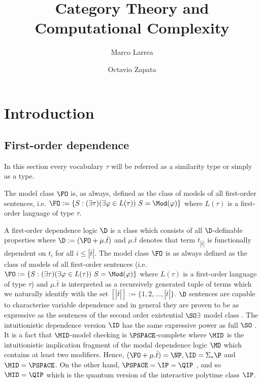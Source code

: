 


\title{Category Theory and \\ Computational Complexity}
\author{Marco Larrea \and Octavio Zapata}


\maketitle

\section{Introduction}

\subsection{First-order dependence}

In this section every vocabulary $\tau$ will be referred as a similarity type or simply as a type.

The model class $\FO$ is, as always, defined as the class of models of all first-order sentences, i.e. $\FO:= \{S:(\exists\tau)(\exists\varphi\in L(\tau))\ S=\Mod(\varphi)\}$ where $L(\tau)$ is a first-order language of type $\tau$.

A first-order dependence logic $\D$ is a class which consists of all $\D$-definable properties where $\D := (\FO + \mu.\bar{t})$ and $\mu.\bar{t}$ denotes that term $t_{|\bar{t}|}$ is functionally dependent on $t_{i}$ for all $i\leq |\bar{t}|$. The model class $\FO$ is as always defined as the class of models of all first-order sentences (i.e. $\FO:= \{S:(\exists\tau)(\exists\varphi\in L(\tau))\ S=\Mod(\varphi)\}$ where $L(\tau)$ is a first-order language of type $\tau$) and $\mu.\bar{t}$ is interpreted as a recursively generated tuple of terms which we naturally identify with the set $[|\bar{t}|] := \{1,2,\dots,|\bar{t}|\}$. $\D$ sentences are capable to characterise variable dependence and in general they are proven to be as expressive as the sentences of the second order existential $\SO\exists$ model class \cite{dep}. The intuitionistic dependence version $\ID$ has the same expressive power as full $\SO$ \cite{dep}. It is a fact that $\MID$-model checking is $\PSPACE$-complete \cite{dep} where $\MID$ is the intuitionistic implication fragment of the modal dependence logic $\MD$ which contains at least two modifiers. Hence, $(\FO + \mu.\bar{t}) = \NP, \ID = \Sigma_{\ast}\P$ and $\MID = \PSPACE$.  On the other hand, $\PSPACE = \IP = \QIP$ \cite{qip}, and so $\MID = \QIP$ which is the quantum version of the interactive polytime class $\IP$.

